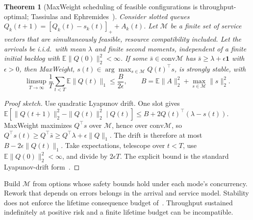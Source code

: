 \documentclass[11pt]{article}
\newtheorem{theorem}{Theorem}
\theoremstyle{definition}
\theoremstyle{remark}
\newcommand{\E}{\mathbb E}
\newcommand{\ind}{\mathbf 1}
\newcommand{\conv}{\mathrm{conv}}
\begin{document}
\begin{theorem}[MaxWeight scheduling of feasible configurations is throughput-optimal; Tassiulas and
Ephremides~\cite{tassiulas}]\label{thm:maxweight}
Consider slotted queues $Q_k(t+1)=[Q_k(t)-s_k(t)]_++A_k(t)$. Let $\mathcal M$ be a finite set of service
vectors that are simultaneously feasible, resource compatibility included. Let the arrivals be
i.i.d.\ with mean $\lambda$ and finite second moments, independent of a finite initial backlog with
$\E\|Q(0)\|_2^2<\infty$. If some $\bar s\in\conv\mathcal M$ has $\bar s\ge\lambda+\epsilon\ind$ with
$\epsilon>0$, then MaxWeight, $s(t)\in\arg\max_{s\in\mathcal M}Q(t)^\top s$, is strongly stable, with
\[
\limsup_{T\to\infty}\frac1T\sum_{t<T}\E\|Q(t)\|_1\le\frac{B}{2\epsilon},\qquad
B=\E\|A\|_2^2+\max_{s\in\mathcal M}\|s\|_2^2 .
\]
\end{theorem}
\begin{proof}[Proof sketch]
Use quadratic Lyapunov drift. One slot gives
$\E[\|Q(t+1)\|_2^2-\|Q(t)\|_2^2\mid Q(t)]\le B+2Q(t)^\top(\lambda-s(t))$. MaxWeight maximizes
$Q^\top s$ over $\mathcal M$, hence over $\conv\mathcal M$, so $Q^\top s(t)\ge Q^\top\bar s\ge
Q^\top\lambda+\epsilon\|Q\|_1$. The drift is therefore at most $B-2\epsilon\|Q(t)\|_1$. Take
expectations, telescope over $t<T$, use $\E\|Q(0)\|_2^2<\infty$, and divide by $2\epsilon T$.
The explicit bound is the standard Lyapunov-drift form~\cite{georgiadis06,neely10}.
\end{proof}
Build $\mathcal M$ from options whose safety bounds hold under each mode's concurrency. Rework that
depends on errors belongs in the arrival and service model. Stability does not enforce the lifetime
consequence budget of~\cite{p6}. Throughput sustained indefinitely at positive risk and a finite
lifetime budget can be incompatible.
\end{document}
